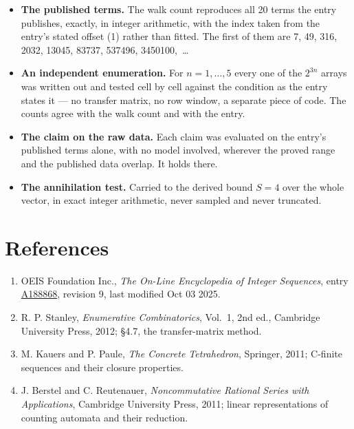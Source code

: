 \documentclass[11pt]{article}
\theoremstyle{definition}
\begin{document}
\begin{itemize}

\item {\bfseries The published terms.} The walk count reproduces all 20 terms the entry publishes, exactly, in integer arithmetic, with the index taken from the entry's stated offset (1) rather than fitted. The first of them are 7, 49, 316, 2032, 13045, 83737, 537496, 3450100,~\dots

\item {\bfseries An independent enumeration.} For $n = 1,\dots,5$ every one of the $2^{3n}$ arrays was written out and tested cell by cell against the condition as the entry states it --- no transfer matrix, no row window, a separate piece of code. The counts agree with the walk count and with the entry.

\item {\bfseries The claim on the raw data.} Each claim was evaluated on the entry's published terms alone, with no model involved, wherever the proved range and the published data overlap. It holds there.

\item {\bfseries The annihilation test.} Carried to the derived bound $S = 4$ over the whole vector, in exact integer arithmetic, never sampled and never truncated.

\end{itemize}

\section{References}

\begin{enumerate}

\item OEIS Foundation Inc., \emph{The On-Line Encyclopedia of Integer Sequences}, entry \href{https://oeis.org/A188868}{A188868}, revision 9, last modified Oct 03 2025.

\item R. P. Stanley, \emph{Enumerative Combinatorics}, Vol.~1, 2nd ed., Cambridge University Press, 2012; \S4.7, the transfer-matrix method.

\item M. Kauers and P. Paule, \emph{The Concrete Tetrahedron}, Springer, 2011; C-finite sequences and their closure properties.

\item J. Berstel and C. Reutenauer, \emph{Noncommutative Rational Series with Applications}, Cambridge University Press, 2011; linear representations of counting automata and their reduction.

\end{enumerate}
\end{document}
